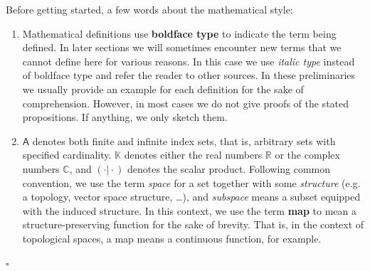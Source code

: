 \begin{rem}
\label{rem:style}
Before getting started, a few words about the mathematical style: 
\begin{enumerate}
\item[$\bullet$]
  Mathematical definitions use \textbf{boldface type} to indicate the term being defined.
In later sections we will sometimes encounter new terms that we cannot define here for various reasons.
In this case we use \textit{italic type} instead of boldface type and refer the reader to other sources.
In these preliminaries we usually provide an example for each definition for the sake of comprehension.
However, in most cases we do not give proofs of the stated propositions.
If anything, we only sketch them. 
\item[$\bullet$]
  $\mathsf{A}$ denotes both finite and infinite index sets, that is, arbitrary sets with specified cardinality.
$\mathbb{K}$ denotes either the real numbers $\mathbb{R}$ or the complex numbers $\mathbb{C}$, and $(\cdot \vert \cdot)$ denotes the scalar product.
Following common convention, we use the term \textit{space} for a set together with some \textit{structure} (e.g. a topology, vector space structure, \ldots), and \textit{subspace} means a subset equipped with the induced structure.
In this context, we use the term \textbf{map} to mean a structure-preserving function for the sake of brevity.
That is, in the context of topological spaces, a map means a continuous function, for example.
\end{enumerate}
\phantom{proven}
\hfill
$\square$
\end{rem}
